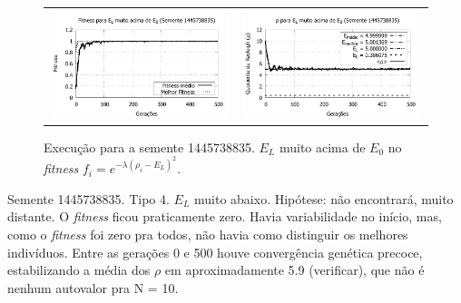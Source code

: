 	\begin{figure}[htbp]
	\centering
  \begin{tabular}{@{}cc@{}}	
		\includegraphics[width=.45\textwidth]{figs/resultados/variandoELSemente/T3_S-1445738835_fitness.pdf} &
    \includegraphics[width=.45\textwidth]{figs/resultados/variandoELSemente/T3_S-1445738835_rho.pdf}
  \end{tabular}
  \caption{Execução para a semente 1445738835. $E_L$ muito acima de $E_0$ no \textit{fitness} $f_i = e^{-\lambda(\rho_i - E_L)^2}$.}
	\label{fig:execucoesSemente_EL_umMuitoAcima}
	\end{figure}
	
	
	Semente 1445738835. Tipo 4. $E_L$ muito abaixo. Hipótese: não encontrará, muito distante. O \emph{fitness} ficou praticamente zero. Havia variabilidade no início, mas, como o \emph{fitness} foi zero pra todos, não havia como distinguir os melhores indivíduos. Entre as gerações 0 e 500 houve convergência genética precoce, estabilizando a média dos $\rho$ em aproximadamente 5.9 (verificar), que não é nenhum autovalor pra N = 10. 
	
